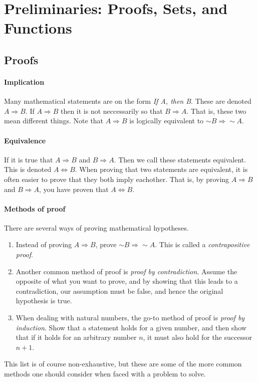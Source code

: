 \chapter{Preliminaries: Proofs, Sets, and Functions}

\section{Proofs}

\subsubsection{Implication}
Many mathematical statements are on the form \textit{If A, then B}. These are
denoted \( A \Rightarrow B \). If \( A \Rightarrow B \) then it is not neccessarily
so that \( B \Rightarrow A \). That is, these two mean different things.
Note that \( A \Rightarrow B \) is logically equivalent to \( \sim B \Rightarrow \sim A \).

\subsubsection{Equivalence}
If it is true that \( A \Rightarrow B \) and \( B \Rightarrow A \). Then we call these
statements equivalent. This is denoted \( A \Longleftrightarrow B \).
When proving that two statements are equivalent, it is often easier to prove that
they both imply eachother. That is, by proving \( A \Rightarrow B \) and \( B \Rightarrow A \), you have proven that \( A \Longleftrightarrow B \).

\subsubsection{Methods of proof}
There are several ways of proving mathematical hypotheses.
\begin{enumerate}
    \item 
Instead of proving \( A \Rightarrow B \), prove \( \sim B \Rightarrow \sim A \).
This is called a \textit{contrapositive proof}.
    \item
Another common method of proof is \textit{proof by contradiction}. Assume the opposite of what you want to prove, and by showing that this leads to a contradiction, our assumption must be false, and hence the original hypothesis is true.
    \item
When dealing with natural numbers, the go-to method of proof is \textit{proof by induction}. Show that a statement holds for a given number, and then show that if it holds for an arbitrary number \(n\), it must also hold for the successor \( n+1 \).
\end{enumerate}
This list is of course non-exhaustive, but these are some of the more common methods one should consider when faced with a problem to solve. 

